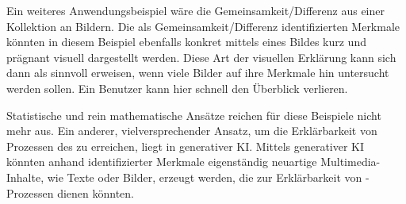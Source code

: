 Ein weiteres Anwendungsbeispiel wäre die Gemeinsamkeit/Differenz aus einer Kollektion an Bildern.
Die als Gemeinsamkeit/Differenz identifizierten Merkmale könnten in diesem Beispiel ebenfalls konkret mittels eines Bildes kurz und prägnant visuell dargestellt werden.
Diese Art der visuellen Erklärung kann sich dann als sinnvoll erweisen, wenn viele Bilder auf ihre Merkmale hin untersucht werden sollen.
Ein Benutzer kann hier schnell den Überblick verlieren.

Statistische und rein mathematische Ansätze reichen für diese Beispiele nicht mehr aus.
Ein anderer, vielversprechender Ansatz, um die Erklärbarkeit von Prozessen des \mmir{} zu erreichen, liegt in generativer KI. Mittels generativer KI könnten anhand identifizierter Merkmale eigenständig neuartige Multimedia-Inhalte, wie Texte oder Bilder, erzeugt werden, die zur Erklärbarkeit von \mmir{}-Prozessen dienen könnten.

